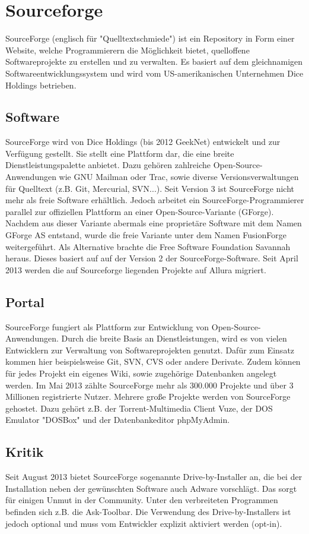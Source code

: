 \section{Sourceforge}
SourceForge (englisch für "Quelltextschmiede") ist ein Repository in Form einer Website,
welche Programmierern die Möglichkeit bietet, quelloffene Softwareprojekte zu erstellen und zu verwalten. 
Es basiert auf dem gleichnamigen Softwareentwicklungssystem und wird vom US-amerikanischen Unternehmen 
Dice Holdings betrieben.
\subsection{Software}
SourceForge wird von Dice Holdings (bis 2012 GeekNet) entwickelt und zur Verfügung gestellt.
Sie stellt eine Plattform dar, die eine breite Dienstleistungspalette anbietet. Dazu gehören zahlreiche Open-Source-Anwendungen
wie GNU Mailman oder Trac, sowie diverse Versionsverwaltungen für Quelltext (z.B. Git, Mercurial, SVN...).
Seit Version 3 ist SourceForge nicht mehr als freie Software erhältlich. Jedoch arbeitet ein SourceForge-Programmierer
parallel zur offiziellen Plattform an einer Open-Source-Variante (GForge). Nachdem aus dieser Variante 
abermals eine proprietäre Software mit dem Namen GForge AS entstand, wurde die freie Variante unter dem Namen FusionForge
weitergeführt. Als Alternative brachte die Free Software Foundation Savannah heraus. Dieses basiert auf
auf der Version 2 der SourceForge-Software.
Seit April 2013 werden die auf Sourceforge liegenden Projekte auf Allura migriert.
\subsection{Portal}
SourceForge fungiert als Plattform zur Entwicklung von Open-Source-Anwendungen. Durch die breite Basis an
Dienstleistungen, wird es von vielen Entwicklern zur Verwaltung von Softwareprojekten genutzt. Dafür zum Einsatz kommen
hier beispielsweise Git, SVN, CVS oder andere Derivate. Zudem können für jedes Projekt
ein eigenes Wiki, sowie zugehörige Datenbanken angelegt werden. Im Mai 2013 zählte SourceForge
mehr als 300.000 Projekte und über 3 Millionen registrierte Nutzer.
Mehrere große Projekte werden von SourceForge gehostet. Dazu gehört z.B. der Torrent-Multimedia Client Vuze,
der DOS Emulator "DOSBox" und der Datenbankeditor phpMyAdmin.
\subsection{Kritik}
Seit August 2013 bietet SourceForge sogenannte Drive-by-Installer an, die bei der Installation 
neben der gewünschten Software auch Adware vorschlägt. Das sorgt für einigen Unmut in der Community. 
Unter den verbreiteten Programmen befinden sich z.B. die Ask-Toolbar. Die Verwendung des
Drive-by-Installers ist jedoch optional und muss vom Entwickler explizit aktiviert werden (opt-in).

